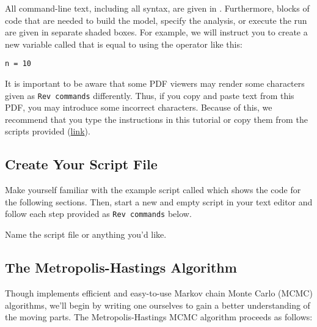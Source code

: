 All command-line text, including all \Rev syntax, are given in . 
Furthermore, blocks of \Rev code that are needed to build the model, specify the analysis, or execute the run are given in separate shaded boxes.
For example, we will instruct you to create a new variable called  that is equal to  using the \cl{=} operator like this:
{\tt \begin{snugshade*}
\begin{lstlisting}
n = 10
\end{lstlisting}
\end{snugshade*}}

It is important to be aware that some PDF viewers may render some characters given as \colorbox{shadecolor}{\tt{Rev commands}} differently. 
Thus, if you copy and paste text from this PDF, you may introduce some incorrect characters. 
Because of this, we recommend that you type the instructions in this tutorial or copy them from the scripts provided (\href{https://github.com/revbayes/revbayes_tutorial/tree/master/RB_MCMC_Archery_Tutorial}{link}). 

\subsection{Create Your Script File}

{\begin{framed}
Make yourself familiar with the example script called \href{https://raw.githubusercontent.com/revbayes/revbayes_tutorial/master/RB_MCMC_Archery_Tutorial/archery_MH.Rev}{} which shows the code for the following sections. Then, start a new and empty script in your text editor and follow each step provided  as \colorbox{shadecolor}{\tt{Rev commands}} below.

Name the script file  or anything you'd like.
\end{framed}}

\subsection{The Metropolis-Hastings Algorithm}\label{sect:MH_algorithm}
Though \RevBayes implements efficient and easy-to-use Markov chain Monte Carlo (MCMC) algorithms, we'll begin by writing one ourselves to gain a better understanding of the moving parts.
The Metropolis-Hastings MCMC algorithm \citep{Metropolis1953,Hastings1970} proceeds as follows:

